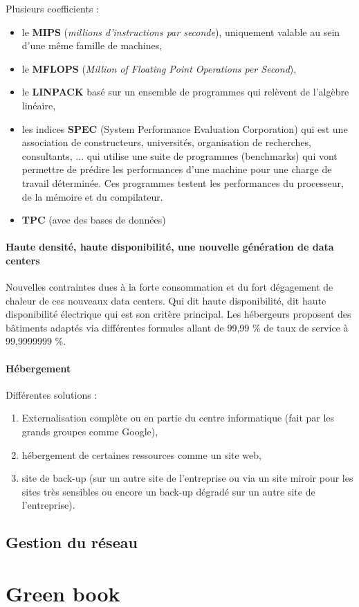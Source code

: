 \documentclass[10pt,a4paper,oneside,titlepage]{report}
\begin{document}
\begin{sffamily}
Plusieurs coefficients : \begin{itemize}
\item le \textbf{MIPS} (\textit{millions d'instructions par seconde}), uniquement valable au sein d'une m\^eme famille de machines,
\item le \textbf{MFLOPS} (\textit{Million of Floating Point Operations per Second}),
\item le \textbf{LINPACK} basé sur un ensemble de programmes qui relèvent de l'algèbre linéaire,
\item les indices \textbf{SPEC} (System Performance Evaluation Corporation) qui est une association de constructeurs, universités, organisation de recherches, consultants, ... qui utilise une suite de programmes (benchmarks) qui vont permettre de 
prédire les performances d'une machine pour une charge de travail déterminée. Ces programmes testent les performances du processeur, de la mémoire et du compilateur.
\item \textbf{TPC} (avec des bases de données)
\end{itemize}

\subsubsection{Haute densité, haute disponibilité, une nouvelle génération de data centers}

Nouvelles contraintes dues à la forte consommation et du fort dégagement de chaleur de ces nouveaux data centers. Qui dit haute disponibilité, dit haute disponibilité électrique qui est son critère principal. Les hébergeurs proposent des b\^atiments adaptés via différentes formules allant de 99,99 \% de taux de service à 99,9999999 \%.

\subsubsection{Hébergement}

Différentes solutions :\begin{enumerate}
\item Externalisation complète ou en partie du centre informatique (fait par les grands groupes comme Google),
\item hébergement de certaines ressources comme un site web,
\item site de back-up (sur un autre site de l'entreprise ou via un site miroir pour les sites très sensibles ou encore un back-up dégradé sur un autre site de l'entreprise).
\end{enumerate}

\section{Gestion du réseau}



\chapter{Green book}

\end{sffamily} 
\end{document}
